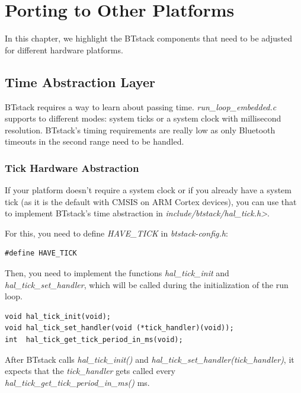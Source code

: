 \documentclass[a4paper,titlepage,oneside,12pt]{amsart} %
\begin{document}

\section{Porting to Other Platforms}

In this chapter, we highlight the BTstack components that need to be adjusted for different hardware platforms.

\subsection{Time Abstraction Layer}
\label{section:timeAbstraction}
BTstack requires a way to learn about passing time. \emph{run\_loop\_embedded.c} supports to different modes: system ticks or a system clock with millisecond resolution. BTstack's timing requirements are really low as only Bluetooth timeouts in the second range need to be handled.

\subsubsection{Tick Hardware Abstraction}
\label{ssection:tickAbstraction}

If your platform doesn't require a system clock or if you already have a system tick (as it is the default with CMSIS on ARM Cortex devices), you can use that to implement BTstack's time abstraction in \emph{include/btstack/hal\_tick.h>}.

For this, you need to define \emph{HAVE\_TICK} in \emph{btstack-config.h}:
\begin{lstlisting}
#define HAVE_TICK
\end{lstlisting}

Then, you need to implement the functions \emph{hal\_tick\_init} and \emph{hal\_tick\_set\_handler}, which will be called during the initialization of the run loop.
 
\begin{lstlisting}
void hal_tick_init(void);
void hal_tick_set_handler(void (*tick_handler)(void));
int  hal_tick_get_tick_period_in_ms(void);
\end{lstlisting}
 
After BTstack calls \emph{hal\_tick\_init()} and \emph{hal\_tick\_set\_handler(tick\_handler)}, it expects that the \emph{tick\_handler} gets called every \emph{hal\_tick\_get\_tick\_period\_in\_ms()} ms.
\end{document}
